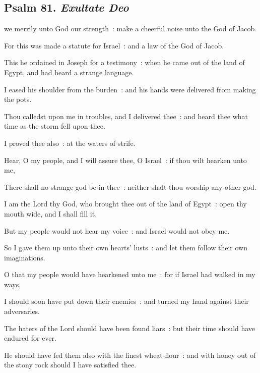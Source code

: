 \subsection{Psalm 81. \textit{Exultate Deo}}

 we merrily unto God our strength~: make a cheerful noise unto the God of Jacob.\par
{}
For this was made a statute for Israel~: and a law of the God of Jacob.\par
{}This he ordained in Joseph for a testimony~: when he came out of the land of Egypt, and had heard a strange language.\par
{}I eased his shoulder from the burden~: and his hands were delivered from making the pots.\par
{}Thou calledst upon me in troubles, and I delivered thee~: and heard thee what time as the storm fell upon thee.\par
{}I proved thee also~: at the waters of strife.\par
{}Hear, O my people, and I will assure thee, O Israel~: if thou wilt hearken unto me,\par
{}There shall no strange god be in thee~: neither shalt thou worship any other god.\par
{}I am the Lord thy God, who brought thee out of the land of Egypt~: open thy mouth wide, and I shall fill it.\par
{}But my people would not hear my voice~: and Israel would not obey me.\par
{}So I gave them up unto their own hearts' lusts~: and let them follow their own imaginations.\par
{}O that my people would have hearkened unto me~: for if Israel had walked in my ways,\par
{}I should soon have put down their enemies~: and turned my hand against their adversaries.\par
{}The haters of the Lord should have been found liars~: but their time should have endured for ever.\par
{}He should have fed them also with the finest wheat-flour~: and with honey out of the stony rock should I have satisfied thee.\par

